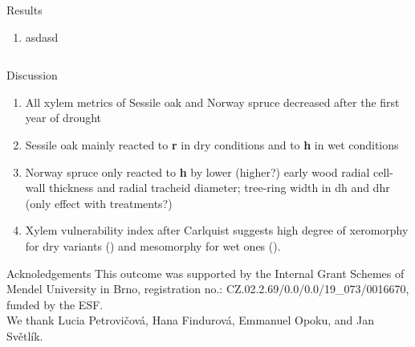 \documentclass[final]{beamer}
\newlength{\sepwidth}
\newlength{\colwidth}
\newcommand{\separatorcolumn}{\begin{column}{\sepwidth}\end{column}}
\begin{document}
\begin{frame}[t]
\begin{columns}[t]
\begin{column}{\colwidth}
\begin{block}{Results}
    \begin{enumerate}
        \item asdasd
    \end{enumerate}

\end{block}

\end{column}
\end{columns}

\begin{columns}[c]
\begin{column}{0.96\paperwidth}

\begin{block}{Discussion}
\begin{multicols}{2}
    \begin{enumerate}
        \item All xylem metrics of Sessile oak and Norway spruce decreased after the first year of drought
        \item Sessile oak mainly reacted to \textbf{r} in dry conditions and to \textbf{h} in wet conditions
        \item Norway spruce only reacted to \textbf{h} by lower (higher?) early wood radial cell-wall thickness and radial tracheid diameter; tree-ring width in dh and dhr (only effect with treatments?)
        \item Xylem vulnerability index after Carlquist \parencite{carlquist1977} suggests high degree of xeromorphy for dry variants () and mesomorphy for wet ones ().
    \end{enumerate}
\AtNextBibliography{\footnotesize} \printbibliography
\end{multicols}
\end{block}

\vfill

\begin{block}{Acknoledgements}
\small \centering
    This outcome was supported by the Internal Grant Schemes of Mendel University in Brno, registration no.: CZ.02.2.69/0.0/0.0/19\_073/0016670, funded by the ESF. \\
    We thank Lucia Petrovičová, Hana Findurová, Emmanuel Opoku, and Jan Světlík.
\end{block}

\end{column}
%
%
\end{columns}
\end{frame}
\end{document}
